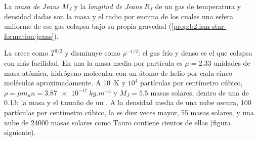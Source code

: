 \begin{definition}\label{def:b2:ism-star-formation:jeans}
La \emph{masa de Jeans} $M_J$ y la \emph{longitud
de Jeans} $R_J$ de un gas de temperatura y densidad dadas
son la masa y el radio por encima de los cuales una esfera uniforme de ese gas
colapsa bajo su propia gravedad (\cref{prop:b2:ism-star-formation:jeans}).
\end{definition}

La  crece como $T^{3/2}$ y disminuye como $\rho^{-1/2}$: el gas frío y denso
es el que colapsa con más facilidad. En una  la masa media por partícula es
$\mu = 2.33$ unidades de masa atómica, hidrógeno molecular con un átomo de helio por
cada cinco moléculas aproximadamente. A \qty{10}{K} y $10^4$ partículas por centímetro
cúbico, $\rho = \mu m_u n = \qty{3.87e-17}{kg.m^{-3}}$ y
$M_J = 5.5$ masas solares, dentro de una  de \qty{0.13}{\parsec}:
la masa y el tamaño de un . A la densidad media de una nube oscura,
$100$ partículas por centímetro cúbico, la  es diez veces mayor, 55
masas solares, y una nube de \num{24000} masas solares como Tauro contiene
cientos de ellas (figura siguiente).

